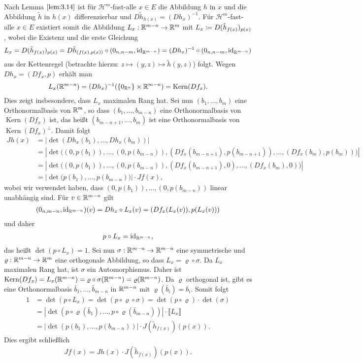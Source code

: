 \documentclass[a4paper,twoside,DIV15,BCOR12mm]{scrbook}
\newcommand{\HM}{\mathscr H}
\newcommand{\id}{\mathrm{id}}
\DeclareMathOperator{\Kern}{Kern}
\begin{document}
\begin{beweis}
Nach Lemma $\ref{lem:3.14}$ ist für $\HM^m$-fast-alle $x\in E$ die Abbildung $h$ in $x$ und die Abbildung $\tilde h$ in $h(x)$ differenzierbar und $D\tilde h_{h(x)} = (Dh_x)^{-1}$. Für $\HM^m$-fast-alle $x\in E$ existiert somit die Abbildung $L_x:\mathbb{R}^{m-n}\to\mathbb{R}^m$ mit $L_x\da D(\tilde h_{f(x)})_{p(x)}$, wobei die Existenz und die erste  Gleichung
$$
L_x= D(\tilde h_{f(x)})_{p(x)} 
= D\tilde h_{(f(x),p(x))} \circ (0_{n,n-m}, \id_{\MdR^{m-n}})=(D h_x)^{-1}\circ (0_{n,n-m}, \id_{\MdR^{m-n}})
$$
aus der Kettenregel  (betrachte hierzu: $z\mapsto (y,z)\mapsto \tilde h(y,z)$) folgt. Wegen 
$Dh_x = (Df_x,p)$ erhält man  
\begin{align*}
L_x(\MdR^{m-n}) = (Dh_x)^{-1}(\{0_{\MdR^n}\} \times \MdR^{m-n}) = \Kern(Df_x).
\end{align*}
Dies zeigt insbesondere, dass $L_x$ maximalen Rang hat. 
Sei nun $(b_1,\ldots,b_m)$ eine Orthonormalbasis von $\mathbb{R}^m$, so dass $(b_1,\ldots,b_{m-n})$ eine Orthonormalbasis von $\Kern(Df_x)$ ist, das heißt $(b_{m-n+1},\ldots,b_m)$ ist eine Orthonormalbasis von $\Kern(Df_x)^\bot$. Damit folgt
\begin{align*}
Jh(x) 
&= |\det(Dh_x(b_1),\ldots,Dh_x(b_m))|\\
&= |\det\big( (0,p(b_1)),\ldots,(0,p(b_{m-n})), (Df_x(b_{m-n+1}),p(b_{m-n+1})),\ldots,(Df_x(b_{m}),p(b_{m}))\big)|\\
&= |\det\big( (0,p(b_1)),\ldots,(0,p(b_{m-n})), (Df_x(b_{m-n+1}),0),\ldots,(Df_x(b_{m}),0)\big)|\\
&= |\det\big( p(b_1),\ldots,p(b_{m-n})\big)| \cdot Jf(x) ,
\end{align*}
wobei wir verwendet haben, dass $(0,p(b_1)),\ldots,(0,p(b_{m-n}))$ linear unabhängig sind. 
Für $v\in\mathbb{R}^{m-n}$ gilt
\begin{align*}
(0_{n,m-n}, \id_{\MdR^{m-n}})(v) = Dh_x \circ L_x(v) = (Df_x(L_x(v)), p(L_x(v))) 
\end{align*}
und daher
\begin{align*}
p\circ L_x = \id_{\MdR^{m-n}},
\end{align*}
das heißt $\det(p\circ L_x)=1$. Sei nun $\sigma:\mathbb{R}^{m-n} \to \mathbb{R}^{m-n}$ eine symmetrische und $\varrho:\mathbb{R}^{m-n}\to\mathbb{R}^m$ eine orthogonale Abbildung, so dass $L_x=\varrho \circ \sigma$. Da $L_x$ 
maximalen Rang hat, ist $\sigma$ ein Automorphismus. Daher ist $\Kern(Df_x) = L_x(\MdR^{m-n}) = \varrho\circ\sigma(\MdR^{m-n}) = \varrho(\MdR^{m-n})$. Da $\varrho$ orthogonal ist, gibt es eine Orthonormalbasis $\bar b_1,\ldots,\bar b_{m-n}$ in $ \mathbb{R}^{m-n}$ mit $\varrho(\bar b_i) = b_i$. Somit folgt
\begin{align*}
1 &= \det(p\circ L_x) = \det(p\circ\varrho\circ\sigma) = \det(p\circ \varrho) \cdot \det(\sigma) \\
&= |\det( p\circ\varrho(\bar b_1), \ldots, p\circ\varrho(\bar b_{m-n}))| \cdot \llbracket L_x\rrbracket \\
&= |\det( p(b_1), \ldots, p(b_{m-n}))| \cdot J(\tilde h_{f(x)})(p(x)).
\end{align*}
Dies ergibt schließlich
\begin{align*}
Jf(x) = Jh(x) \cdot J(\tilde h_{f(x)}) (p(x)).
\end{align*}


\end{beweis}
\end{document}
